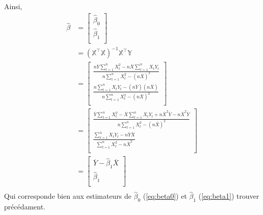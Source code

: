 \documentclass[11pt,french]{report}
\begin{document}
Ainsi,
\begin{align*}
\hat{\beta} &= 
\begin{bmatrix} 
\hat{\beta}_0 \\
\hat{\beta}_1 \\
\end{bmatrix} \\
&= (\mathbb{X}^\intercal\mathbb{X})^{-1}\mathbb{X}^\intercal\mathbb{Y} \\
&= 
\begin{bmatrix} 
\frac{n \overline{Y} \sum_{t=1}^n X_t^2 - n \overline{X} \sum_{t=1}^n X_tY_t}{n \sum_{t=1}^n X_t^2 - (n \overline{X})^2} \\
\frac{n\sum_{t=1}^n X_tY_t - (n \overline{Y})(n \overline{X}) }{n \sum_{t=1}^n X_t^2 - (n \overline{X})^2} \\
\end{bmatrix} \\
&=
\begin{bmatrix} 
\frac{\overline{Y} \sum_{t=1}^n X_t^2 - \overline{X} \sum_{t=1}^n X_tY_t + n\overline{X}^2\overline{Y} - n\overline{X}^2\overline{Y}}{n \sum_{t=1}^n X_t^2 - (n \overline{X})^2} \\
\frac{\sum_{t=1}^n X_tY_t - n\overline{Y}\overline{X}}{\sum_{t=1}^n X_t^2 - n \overline{X}^2} \\
\end{bmatrix} \\
&=
\begin{bmatrix} 
\overline{Y} - \hat{\beta}_1\overline{X} \\
\hat{\beta}_1 \\
\end{bmatrix} \\
\end{align*}
Qui corresponde bien aux estimateurs de $\hat{\beta}_0$ (\ref{eq:beta0}) et $\hat{\beta}_1$ (\ref{eq:beta1}) trouver précédament.
\end{document}
